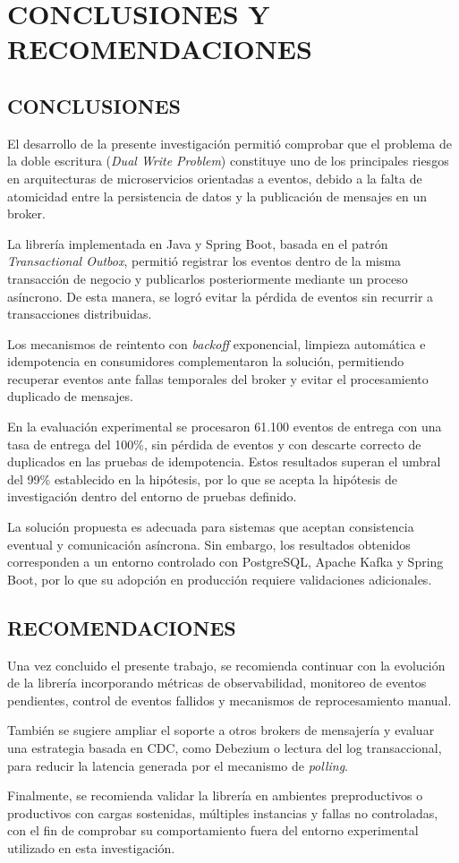 \clearpage
\chapter{CONCLUSIONES Y RECOMENDACIONES}

\section{CONCLUSIONES}

El desarrollo de la presente investigación permitió comprobar que el problema de la doble escritura (\textit{Dual Write Problem}) constituye uno de los principales riesgos en arquitecturas de microservicios orientadas a eventos, debido a la falta de atomicidad entre la persistencia de datos y la publicación de mensajes en un broker.

La librería implementada en Java y Spring Boot, basada en el patrón \textit{Transactional Outbox}, permitió registrar los eventos dentro de la misma transacción de negocio y publicarlos posteriormente mediante un proceso asíncrono. De esta manera, se logró evitar la pérdida de eventos sin recurrir a transacciones distribuidas.

Los mecanismos de reintento con \textit{backoff} exponencial, limpieza automática e idempotencia en consumidores complementaron la solución, permitiendo recuperar eventos ante fallas temporales del broker y evitar el procesamiento duplicado de mensajes.

En la evaluación experimental se procesaron 61.100 eventos de entrega con una tasa de entrega del 100\%, sin pérdida de eventos y con descarte correcto de duplicados en las pruebas de idempotencia. Estos resultados superan el umbral del 99\% establecido en la hipótesis, por lo que se acepta la hipótesis de investigación dentro del entorno de pruebas definido.

La solución propuesta es adecuada para sistemas que aceptan consistencia eventual y comunicación asíncrona. Sin embargo, los resultados obtenidos corresponden a un entorno controlado con PostgreSQL, Apache Kafka y Spring Boot, por lo que su adopción en producción requiere validaciones adicionales.

\section{RECOMENDACIONES}

Una vez concluido el presente trabajo, se recomienda continuar con la evolución de la librería incorporando métricas de observabilidad, monitoreo de eventos pendientes, control de eventos fallidos y mecanismos de reprocesamiento manual.

También se sugiere ampliar el soporte a otros brokers de mensajería y evaluar una estrategia basada en CDC, como Debezium o lectura del log transaccional, para reducir la latencia generada por el mecanismo de \textit{polling}.

Finalmente, se recomienda validar la librería en ambientes preproductivos o productivos con cargas sostenidas, múltiples instancias y fallas no controladas, con el fin de comprobar su comportamiento fuera del entorno experimental utilizado en esta investigación.
